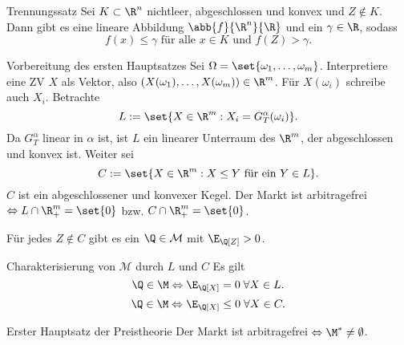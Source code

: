 \begin{karte}{Trennungssatz}
Sei \(K \subset \R^n\) nichtleer, abgeschlossen und konvex und 
\(Z\notin K\). Dann gibt es eine lineare Abbildung \(\abb{f}{\R^n}{\R}\) 
und ein \(\gamma \in \R\), sodass 
\[ f(x) \leq \gamma \text{ für alle } x\in K \text{ und } f(Z) > \gamma. \]
\end{karte}

\begin{karte}{Vorbereitung des ersten Hauptsatzes}
Sei \(\Omega = \set{\omega_1, \ldots, \omega_m}\). Interpretiere 
eine ZV \(X\) als Vektor, also \((X(\omega_1), \ldots, X(\omega_m)) \in \R^m\).
Für \(X(\omega_i)\) schreibe auch \(X_i\). Betrachte 
\[ L := \set{X \in \R^m: X_i = G_T^\alpha(\omega_i)}. \]
Da \(G_T^\alpha\) linear in \(\alpha\) ist, ist \(L\) ein linearer Unterraum des \(\R^m\), 
der abgeschlossen und konvex ist. Weiter sei 
\[ C := \set{ X \in \R^m: X \leq Y \text{ für ein } Y \in L }. \]
\(C \) ist ein abgeschlossener und konvexer Kegel. Der Markt ist arbitragefrei 
\(\Leftrightarrow L\cap \R_+^m = \set{0}\) bzw. \(C \cap \R_+^m = \set{0}\).

Für jedes \(Z\notin C\) gibt es ein \(\Q \in \mathcal{M}\) mit \(\E_\Q[Z]>0\).
\end{karte}

\begin{karte}{Charakterisierung von \(\mathcal{M}\) durch \(L\) und \(C\)}
Es gilt 
\[ \Q \in \M \Leftrightarrow \E_\Q[X] = 0 \;\forall X\in L. \]
\[ \Q\in \M \Leftrightarrow \E_\Q[X] \leq 0 \;\forall X \in C. \]
\end{karte}

\begin{karte}{Erster Hauptsatz der Preistheorie}
Der Markt ist arbitragefrei \(\Leftrightarrow \M^* \neq \emptyset\).
\end{karte}